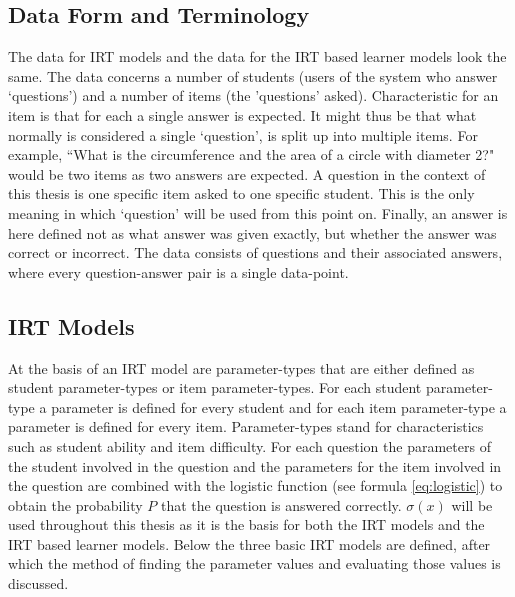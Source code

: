 \documentclass{scrartcl}
\begin{document}
\subsection{Data Form and Terminology}
The data for IRT models and the data for the IRT based learner models look the same. The data concerns a number of students (users of the system who answer `questions') and a number of items (the 'questions' asked). Characteristic for an item is that for each a single answer is expected. It might thus be that what normally is considered a single `question', is split up into multiple items. For example, ``What is the circumference and the area of a circle with diameter 2?" would be two items as two answers are expected. A question in the context of this thesis is one specific item asked to one specific student. This is the only meaning in which `question' will be used from this point on. Finally, an answer is here defined not as what answer was given exactly, but whether the answer was correct or incorrect. The data consists of questions and their associated answers, where every question-answer pair is a single data-point.  

\subsection{IRT Models}
At the basis of an IRT model are parameter-types that are either defined as student parameter-types or item parameter-types. For each student parameter-type a parameter is defined for every student and for each item parameter-type a parameter is defined for every item. Parameter-types stand for characteristics such as student ability and item difficulty. For each question the parameters of the student involved in the question and the parameters for the item involved in the question are combined with the logistic function (see formula \ref{eq:logistic}) to obtain the probability $P$ that the question is answered correctly. $\sigma(x)$ will be used throughout this thesis as it is the basis for both the IRT models and the IRT based learner models. Below the three basic IRT models are defined, after which the method of finding the parameter values and evaluating those values is discussed. 

 
\end{document}
